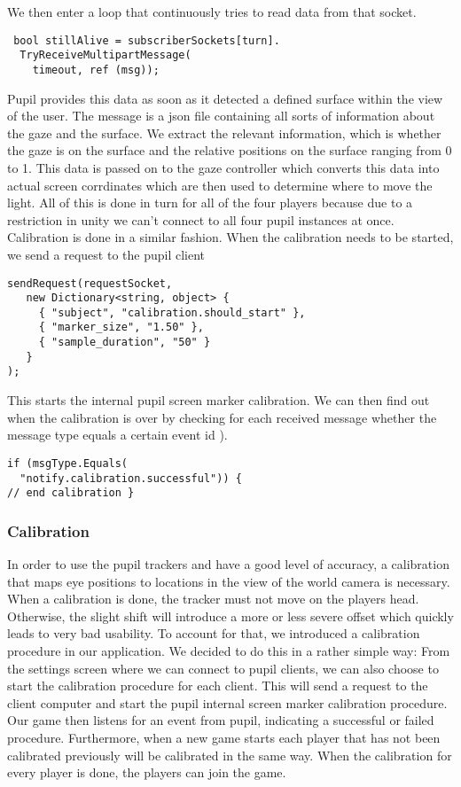 \documentclass{sigchi}
\begin{document}
We then enter a loop that continuously tries to read data from that socket.
 \begin{verbatim}
 bool stillAlive = subscriberSockets[turn].
  TryReceiveMultipartMessage(
    timeout, ref (msg));
\end{verbatim}

  
  Pupil provides this data as soon as it detected a defined surface within the view of the user. The message is a json file containing all sorts of information about the gaze and the surface. We extract the relevant information, which is whether the gaze is on the surface and the relative positions on the surface ranging from 0 to 1. This data is passed on to the gaze controller which converts this data into actual screen corrdinates which are then used to determine where to move the light. All of this is done in turn for all of the four players because due to a restriction in unity we can't connect to all four pupil instances at once.\\
Calibration is done in a similar fashion. When the calibration needs to be started, we send a request to the pupil client 
 \begin{verbatim}
sendRequest(requestSocket,
   new Dictionary<string, object> { 
     { "subject", "calibration.should_start" }, 
     { "marker_size", "1.50" }, 
     { "sample_duration", "50" } 
   }
);
\end{verbatim}


This starts the internal pupil screen marker calibration. We can then find out when the calibration is over by checking for each received message whether the message type equals a certain event id ).
 \begin{verbatim}
if (msgType.Equals(
  "notify.calibration.successful")) {
// end calibration }
\end{verbatim}

\subsubsection{Calibration}
In order to use the pupil trackers and have a good level of accuracy, a calibration that maps eye positions to locations in the view of the world camera is necessary. When a calibration is done, the tracker must not move on the players head. Otherwise, the slight shift will introduce a more or less severe offset which quickly leads to very bad usability. To account for that, we introduced a calibration procedure in our application. We decided to do this in a rather simple way: From the settings screen where we can connect to pupil clients, we can also choose to start the calibration procedure for each client. This will send a request to the client computer and start the pupil internal screen marker calibration procedure. Our game then listens for an event from pupil, indicating a successful or failed procedure. Furthermore, when a new game starts each player that has not been calibrated previously will be calibrated in the same way. When the calibration for every player is done, the players can join the game.
\end{document}
